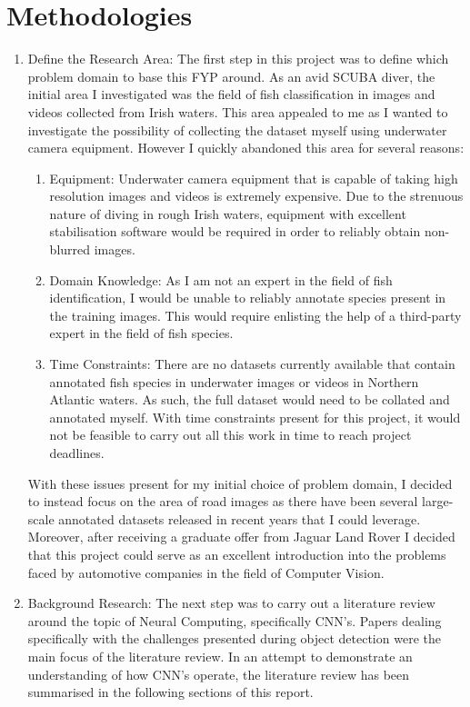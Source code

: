 \documentclass[12pt]{report}
\begin{document}
\section{Methodologies}
\begin{flushleft}
\begin{enumerate}
\item Define the Research Area: The first step in this project was to define which problem domain to base this FYP around. As an avid SCUBA diver, the initial area I investigated was the field of fish classification in images and videos collected from Irish waters. This area appealed to me as I wanted to investigate the possibility of collecting the dataset myself using underwater camera equipment. However I quickly abandoned this area for several reasons:
\begin{enumerate}
\item Equipment: Underwater camera equipment that is capable of taking high resolution images and videos is extremely expensive. Due to the strenuous nature of diving in rough Irish waters, equipment with excellent stabilisation software would be required in order to reliably obtain non-blurred images.
\item Domain Knowledge: As I am not an expert in the field of fish identification, I would be unable to reliably annotate species present in the training images. This would require enlisting the help of a third-party expert in the field of fish species.
\item Time Constraints: There are no datasets currently available that contain annotated fish species in underwater images or videos in Northern Atlantic waters. As such, the full dataset would need to be collated and annotated myself. With time constraints present for this project, it would not be feasible to carry out all this work in time to reach project deadlines.
\end{enumerate}
With these issues present for my initial choice of problem domain, I decided to instead focus on the area of road images as there have been several large-scale annotated datasets released in recent years that I could leverage. Moreover, after receiving a graduate offer from Jaguar Land Rover I decided that this project could serve as an excellent introduction into the problems faced by automotive companies in the field of Computer Vision.
\item Background Research: The next step was to carry out a literature review around the topic of Neural Computing, specifically CNN's. Papers dealing specifically with the challenges presented during object detection were the main focus of the literature review. In an attempt to demonstrate an understanding of how CNN's operate, the literature review has been summarised in the following sections of this report.

\end{enumerate}
\end{flushleft}
\end{document}
